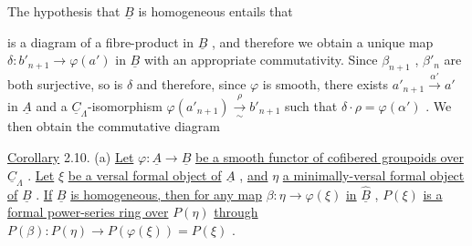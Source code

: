 \begin{center}
\end{center}
The hypothesis that $\underline{B}$ is homogeneous entails that


is a diagram of a fibre-product in $\underline{B}$ , and therefore we obtain a unique map $\delta : b'_{n+1} \to \varphi(a')$ in $\underline{B}$ with an appropriate commutativity. Since $\beta_{n+1}$ , $\beta'_n$ are both surjective, so is $\delta$ and therefore, since $\varphi$ is smooth, there exists $a'_{n+1} \xrightarrow{\ \alpha'\ } a'$ in $\underline{A}$ and a $\underline{C}_{\Lambda}$-isomorphism $\varphi(a'_{n+1}) \xrightarrow[\sim]{\rho} b'_{n+1}$ such that $\delta \cdot \rho = \varphi(\alpha')$ . We then obtain the commutative diagram

\begin{center}
\end{center}
\underline{Corollary} 2.10.  (a) \underline{Let} $\varphi : \underline{A} \to \underline{B}$ \underline{be a smooth functor of cofibered groupoids over} $\underline{C}_{\Lambda}$ . \underline{Let} $\xi$ \underline{be a versal formal object of} $\underline{A}$ , \underline{and} $\eta$ \underline{a minimally-versal formal object of} $\underline{B}$ . \underline{If} $\underline{B}$ \underline{is homogeneous, then for any map} $\beta : \eta \to \varphi(\xi)$ \underline{in} $\underline{\hat{B}}$ , $P(\xi)$ \underline{is a formal power-series ring over} $P(\eta)$ \underline{through} $P(\beta) : P(\eta) \to P(\varphi(\xi)) = P(\xi)$ .


